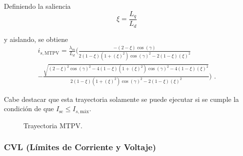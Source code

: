 Definiendo la saliencia  
\begin{equation}
	\xi = \frac{L_q}{L_d}
\end{equation}

y aislando, se obtiene
\begin{equation}
\begin{split}
i_{s,\text{MTPV}} = \frac{\lambda_m}{L_d} ( \frac{-(2 - \xi) \cos(\gamma)}{2(1 - \xi)(1 + (\xi)^2) \cos(\gamma)^2 - 2(1 - \xi) (\xi)^2}\\
-\frac{\sqrt{(2 - \xi)^2 \cos(\gamma)^2 - 4(1 - \xi)(1 + (\xi)^2) \cos(\gamma)^2 - 4(1 - \xi) (\xi)^2}}{2(1 - \xi)(1 + (\xi)^2) \cos(\gamma)^2 - 2(1 - \xi) (\xi)^2} )  \text{ .}
\end{split}
\end{equation}




Cabe destacar que esta trayectoria solamente se puede ejecutar si se cumple la condición de que $I_{\text{sc}} \leq I_{s,\text{máx}}$.


\begin{figure}[H]
  \centering
  \caption{Trayectoria MTPV.}
\end{figure}



\subsubsection{CVL (Límites de Corriente y Voltaje)}


